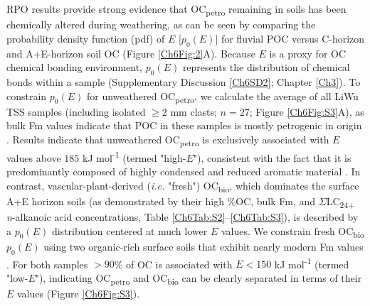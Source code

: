 RPO results provide strong evidence that OC\textsubscript{petro} remaining in soils has been chemically altered during weathering, as can be seen by comparing the probability density function (pdf) of $E$ [$p_{0}(E)$] for fluvial POC versus C-horizon and A+E-horizon soil OC (Figure \ref{Ch6Fig:2}A). Because $E$ is a proxy for OC chemical bonding environment, $p_{0}(E)$ represents the distribution of chemical bonds within a sample (Supplementary Discussion \ref{Ch6SD2}; Chapter \ref{Ch3}). To constrain $p_{0}(E)$ for unweathered OC\textsubscript{petro}, we calculate the average of all LiWu TSS samples (including isolated $\geq 2$ mm clasts; $n = 27$; Figure \ref{Ch6Fig:S3}A), as bulk Fm values indicate that POC in these samples is mostly petrogenic in origin \citep[Table \ref{Ch6Tab:S1};][]{Hilton:2008fo,Hilton:2010cg,Hilton:2011jw}. Results indicate that unweathered OC\textsubscript{petro} is exclusively associated with $E$ values above $185$ kJ mol\textsuperscript{-1} (termed "high-$E$"), consistent with the fact that it is predominantly composed of highly condensed and reduced aromatic material \citep{Galy:2008ff}. In contrast, vascular-plant-derived (\textit{i.e.} "fresh") OC\textsubscript{bio}, which dominates the surface A+E horizon soils (as demonstrated by their high \%OC, bulk Fm, and $\Sigma$LC\textsubscript{24+} \textit{n}-alkanoic acid concentrations, Table \ref{Ch6Tab:S2}--\ref{Ch6Tab:S3}), is described by a $p_{0}(E)$ distribution centered at much lower $E$ values. We constrain fresh OC\textsubscript{bio} $p_{0}(E)$ using two organic-rich surface soils that exhibit nearly modern Fm values \citep[\%OC $> 5$\%, Fm $> 0.96$; Table \ref{Ch6Tab:S2};][]{Hilton:2013kq}. For both samples $> 90$\% of OC is associated with $E < 150$ kJ mol\textsuperscript{-1} (termed "low-$E$"), indicating OC\textsubscript{petro} and OC\textsubscript{bio} can be clearly separated in terms of their $E$ values (Figure \ref{Ch6Fig:S3}). 

